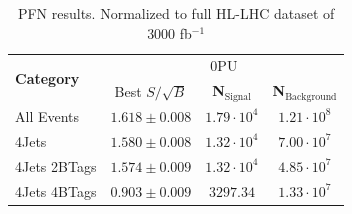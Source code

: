 \begin{table}[ht!]
\centering

    \begin{tabular}{|l|c|c|c|} %
      \hline\hline
      \multirow{2}{*}{\textbf{Category}} & \multicolumn{3}{c|}{0PU}\\
      \cline{2-4}
      & Best $S/\sqrt{B}$ & \textbf{N$_{\mathrm{Signal}}$} & \textbf{N$_{\mathrm{Background}}$} \\
      \hline
      All Events & $1.618 \pm 0.008$ & $1.79\cdot 10^4$ & $1.21\cdot 10^8$ \\
      4Jets & $1.580 \pm 0.008$ & $1.32\cdot 10^4$ & $7.00\cdot 10^7$ \\
      4Jets 2BTags & $1.574 \pm 0.009$ & $1.32\cdot 10^4$ & $4.85\cdot 10^7$ \\
      4Jets 4BTags & $0.903 \pm 0.009$ & $3297.34$ & $1.33\cdot 10^7$ \\
      \hline\hline
    \end{tabular}
    \caption{PFN results. Normalized to full HL-LHC dataset of 3000 fb$^{-1}$}
\label{PFNtab}
\end{table}



%
%
%

